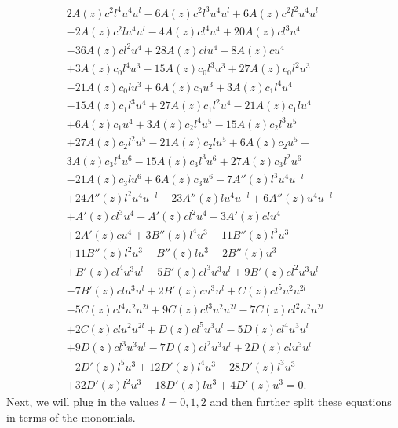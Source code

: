 \begin{equation}
  \begin{split}
    2 A(z) c^{2} l^{4} u^{4} u^{l} - 6 A(z) c^{2} l^{3} u^{4} u^{l} + 6 A(z) c^{2} l^{2} u^{4} u^{l}&\\
    - 2 A(z) c^{2} l u^{4} u^{l} - 4 A(z) c l^{4} u^{4} + 20 A(z) c l^{3} u^{4}&\\
    - 36 A(z) c l^{2} u^{4} + 28 A(z) c l u^{4} - 8 A(z) c u^{4} &\\
    + 3 A(z) c_{0} l^{4} u^{3} - 15 A(z) c_{0} l^{3} u^{3} + 27 A(z) c_{0} l^{2} u^{3}&\\
    - 21 A(z) c_{0} l u^{3} + 6 A(z) c_{0} u^{3} + 3 A(z) c_{1} l^{4} u^{4} &\\
    - 15 A(z) c_{1} l^{3} u^{4} + 27 A(z) c_{1} l^{2} u^{4} - 21 A(z) c_{1} l u^{4} &\\
    + 6 A(z) c_{1} u^{4} + 3 A(z) c_{2} l^{4} u^{5} - 15 A(z) c_{2} l^{3} u^{5} &\\
    + 27 A(z) c_{2} l^{2} u^{5} - 21 A(z) c_{2} l u^{5} + 6 A(z) c_{2} u^{5} + &\\
    3 A(z) c_{3} l^{4} u^{6} - 15 A(z) c_{3} l^{3} u^{6} + 27 A(z) c_{3} l^{2} u^{6} &\\
    - 21 A(z) c_{3} l u^{6} + 6 A(z) c_{3} u^{6} - 7 A''(z) l^{3} u^{4} u^{- l}&\\
    + 24 A''(z) l^{2} u^{4} u^{- l} - 23 A''(z) l u^{4} u^{- l} + 6 A''(z) u^{4} u^{- l} &\\
    + A'(z) c l^{3} u^{4} - A'(z) c l^{2} u^{4} - 3 A'(z) c l u^{4}&\\
    + 2 A'(z) c u^{4} + 3 B''(z) l^{4} u^{3} - 11 B''(z) l^{3} u^{3}&\\
    + 11 B''(z) l^{2} u^{3} - B''(z) l u^{3} - 2 B''(z) u^{3} &\\
    + B'(z) c l^{4} u^{3} u^{l} - 5 B'(z) c l^{3} u^{3} u^{l} + 9 B'(z) c l^{2} u^{3} u^{l}&\\
    - 7 B'(z) c l u^{3} u^{l} + 2 B'(z) c u^{3} u^{l} + C(z) c l^{5} u^{2} u^{2 l} &\\
    - 5 C(z) c l^{4} u^{2} u^{2 l} + 9 C(z) c l^{3} u^{2} u^{2 l} - 7 C(z) c l^{2} u^{2} u^{2 l}&\\
    + 2 C(z) c l u^{2} u^{2 l} + D(z) c l^{5} u^{3} u^{l} - 5 D(z) c l^{4} u^{3} u^{l} &\\
    + 9 D(z) c l^{3} u^{3} u^{l} - 7 D(z) c l^{2} u^{3} u^{l} + 2 D(z) c l u^{3} u^{l}&\\
    - 2 D'(z) l^{5} u^{3} + 12 D'(z) l^{4} u^{3} - 28 D'(z) l^{3} u^{3}&\\
    + 32 D'(z) l^{2} u^{3} - 18 D'(z) l u^{3} + 4 D'(z) u^{3}=0.
  \end{split}
\end{equation}
Next, we will plug in the values $l=0,1,2$ and then further split these equations in terms of the monomials.

